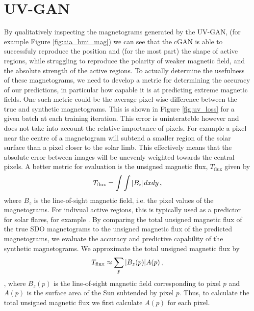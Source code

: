 \documentclass[11pt,a4paper,onecolumn]{report}
\begin{document}
\section{UV-GAN}
By qualitatively inspecting the magnetograms generated by the UV-GAN, (for
example Figure \ref{fig:aia_hmi_mag}) we can see that the cGAN is able to
successfuly reproduce the position and (for the most part) the shape of active
regions, while struggling to reproduce the polarity of weaker magnetic field,
and the absolute strength of the active regions. To actually determine the
usefulness of these magnetograms, we need to develop a metric for determining
the accuracy of our predictions, in particular how capable it is at predicting
extreme magnetic fields. One such metric could be the average pixel-wise
difference between the true and synthetic magnetograms. This is shown in Figure
\ref{fig:uv_loss} for a given batch at each training iteration. This error is
uninterateble however and does not take into account the relative importance of
pixels. For example a pixel near the centre of a magnetogram will subtend a
smaller region of the solar surface than a pixel closer to the solar limb. This
effectively means that the absolute error between images will be unevenly
weighted towards the central pixels. A better metric for evaluation is the
unsigned magnetic flux, \(T_{\text{flux}}\) given by
\begin{align}
  T_{\text{flux}} = \int \int \absolutevalue{B_z} dx dy \, ,
\end{align}
where \(B_z\) is the line-of-sight magnetic field, i.e. the pixel values of the
magnetograms. For indivual active regions, this is typically used as a predictor
for solar flares, for example
\citet{song_statistical_2009,yuan_solar_2010,lan_automated_2012,chen_identifying_2019}.
By comparing the total unsigned magnetic flux of the true SDO magnetograms to
the unsigned magnetic flux of the predicted magnetograms, we evaluate the
accuracy and predictive capability of the synthetic magnetograms. We approximate
the total unsigned magnetic flux by 
\begin{align}
  T_{\text{flux}} \approx \sum\limits_p \absolutevalue{B_z(p)} A(p) \, ,
\end{align},
where $B_z(p)$ is the line-of-sight magnetic field corresponding to pixel $p$
and $A(p)$ is the surface area of the Sun subtended by pixel $p$. Thus, to
calculate the total unsigned magnetic flux we first calculate $A(p)$ for each
pixel.\\
\end{document}
